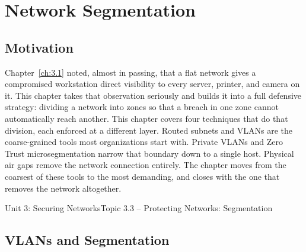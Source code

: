 \chapter{Network Segmentation}
\label{ch:3.3}


\section{Motivation}

Chapter~\ref{ch:3.1} noted, almost in passing, that a flat network gives a compromised
workstation direct visibility to every server, printer, and camera on it. This chapter takes that
observation seriously and builds it into a full defensive strategy: dividing a network into zones
so that a breach in one zone cannot automatically reach another. This chapter covers four
techniques that do that division, each enforced at a different layer. Routed subnets and VLANs are
the coarse-grained tools most organizations start with. Private VLANs and Zero Trust
microsegmentation narrow that boundary down to a single host. Physical air gaps remove the network
connection entirely. The chapter moves from the coarsest of these tools to the most demanding, and
closes with the one that removes the network altogether.

\begin{apalignment}{Unit 3: Securing Networks}{Topic 3.3 -- Protecting Networks: Segmentation}
\begin{apobjectives}
\end{apobjectives}
\end{apalignment}

\section{VLANs and Segmentation}

